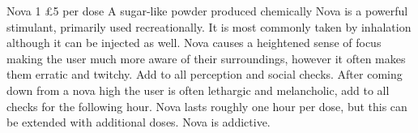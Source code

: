 \documentclass{article}
\begin{document}
\begin{multicols}{2}
\Equipment
{Nova}
{1}
{£5 per dose}
{A sugar-like powder produced chemically}
{Nova is a powerful stimulant, primarily used recreationally. It is most commonly taken by inhalation although it can be injected as well. Nova causes a heightened sense of focus making the user much more aware of their surroundings, however it often makes them erratic and twitchy. Add \Blue[1] to all perception and social checks. After coming down from a nova high the user is often lethargic and melancholic, add \Black[2] to all checks for the following hour. Nova lasts roughly one hour per dose, but this can be extended with additional doses. Nova is addictive.}
\end{multicols}
\newpage
\end{document}
